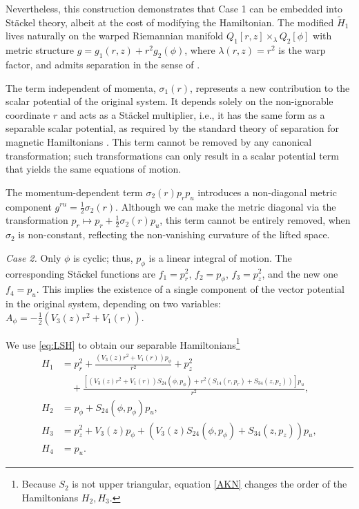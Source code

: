 \documentclass[10pt]{amsart}
\numberwithin{equation}{section}
\theoremstyle{definition}
\begin{document}
Nevertheless, this construction demonstrates that Case 1 can be embedded into Stäckel theory, albeit at the cost of modifying the Hamiltonian. The modified $\tilde{H}_1$ lives naturally on the warped Riemannian manifold $Q_1[r,z]\times_\lambda Q_2[\phi]$ with metric structure $g=g_1(r,z)+r^2 g_2(\phi)$, where $\lambda(r,z)=r^2$ is the warp factor, and admits separation in the sense of \cite{Benenti2001}.

The term independent of momenta, $\sigma_1(r)$, represents a new contribution to the scalar potential of the original system. It depends solely on the non-ignorable coordinate $r$ and acts as a Stäckel multiplier, i.e., it has the same form as a separable scalar potential, as required by the standard theory of separation for magnetic Hamiltonians \cite{Benenti2001}. This term cannot be removed by any canonical transformation; such transformations can only result in a scalar potential term that yields the same equations of motion.

The momentum-dependent term $\sigma_2(r) p_r p_u$ introduces a non-diagonal metric component $g^{ru} = \frac{1}{2}\sigma_2(r)$. Although we can make the metric diagonal via the transformation $p_r \mapsto p_r + \frac{1}{2}\sigma_2(r) p_u$, this term cannot be entirely removed, when $\sigma_2$ is non-constant, reflecting the non-vanishing curvature of the lifted space.

\vspace{2mm}

\textit{Case 2.} Only $\phi$ is cyclic; thus, $p_\phi$ is a linear integral of motion. The corresponding St\"ackel functions are $f_1=p_r^2$, $f_2=p_{\phi}$, $f_3=p^2_z$, and the new one $f_4=p_u$. This implies the existence of a single component of the vector potential in the original system, depending on two variables: $A_\phi=-\frac{1}{2}(V_3(z) r^2 + V_1(r))$.

We use \eqref{eq:LSH} to obtain our separable Hamiltonians\footnote{Because $S_2$ is not upper triangular, equation \eqref{AKN} changes the order of the Hamiltonians $H_2, H_3$.}
\begin{equation}
	\begin{split}
		H_1 &= p_r^2 + \frac{(V_3(z) r^2 + V_1(r)) p_\phi}{r^2} + p_z^2 \\
		&\quad + \frac{[(V_3(z) r^2 + V_1(r)) S_{24}(\phi, p_\phi) + r^2( S_{14}(r, p_r)+S_{34}(z, p_z))] p_u}{r^2}, \\
		H_2 &= p_\phi + S_{24}(\phi, p_\phi) p_u, \\
		H_3 &= p_z^2 +V_3(z) p_\phi + (V_3(z) S_{24}(\phi, p_\phi) + S_{34}(z, p_z)) p_u, \\
		H_4 &= p_u.
	\end{split}
\end{equation}
\end{document}
